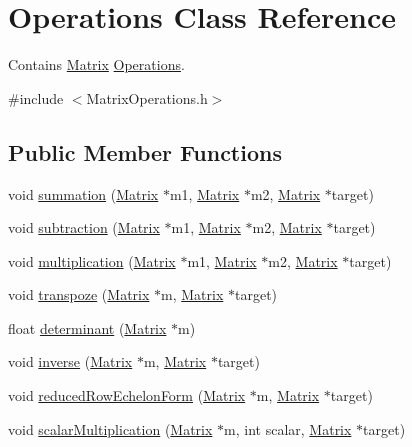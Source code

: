 \hypertarget{class_operations}{}\section{Operations Class Reference}
\label{class_operations}


Contains \hyperlink{class_matrix}{Matrix} \hyperlink{class_operations}{Operations}.  




{\ttfamily \#include $<$Matrix\+Operations.\+h$>$}

\subsection*{Public Member Functions}
\begin{DoxyCompactItemize}
\item 
void \hyperlink{class_operations_a23b256cbd8432c02e7501c7c04d654d7}{summation} (\hyperlink{class_matrix}{Matrix} $\ast$m1, \hyperlink{class_matrix}{Matrix} $\ast$m2, \hyperlink{class_matrix}{Matrix} $\ast$target)
\item 
void \hyperlink{class_operations_a45086ee9e548ad7a199cc4214b841dff}{subtraction} (\hyperlink{class_matrix}{Matrix} $\ast$m1, \hyperlink{class_matrix}{Matrix} $\ast$m2, \hyperlink{class_matrix}{Matrix} $\ast$target)
\item 
void \hyperlink{class_operations_a9187a03ccde6ce58d8a79e0799ae0579}{multiplication} (\hyperlink{class_matrix}{Matrix} $\ast$m1, \hyperlink{class_matrix}{Matrix} $\ast$m2, \hyperlink{class_matrix}{Matrix} $\ast$target)
\item 
void \hyperlink{class_operations_a58bdbb6d16f1848424bbe4bba8e50630}{transpoze} (\hyperlink{class_matrix}{Matrix} $\ast$m, \hyperlink{class_matrix}{Matrix} $\ast$target)
\item 
float \hyperlink{class_operations_a4128cc9366ded09e0a96ef7b229a8d30}{determinant} (\hyperlink{class_matrix}{Matrix} $\ast$m)
\item 
void \hyperlink{class_operations_a6abe02b47920ad0f5a4b87a16d1e8bd0}{inverse} (\hyperlink{class_matrix}{Matrix} $\ast$m, \hyperlink{class_matrix}{Matrix} $\ast$target)
\item 
void \hyperlink{class_operations_a34a11aa508d4fa8343dea7ce3cb12a8f}{reduced\+Row\+Echelon\+Form} (\hyperlink{class_matrix}{Matrix} $\ast$m, \hyperlink{class_matrix}{Matrix} $\ast$target)
\item 
void \hyperlink{class_operations_a3ebc22c78ef8e19ebdc5d2761b103d22}{scalar\+Multiplication} (\hyperlink{class_matrix}{Matrix} $\ast$m, int scalar, \hyperlink{class_matrix}{Matrix} $\ast$target)
\end{DoxyCompactItemize}


